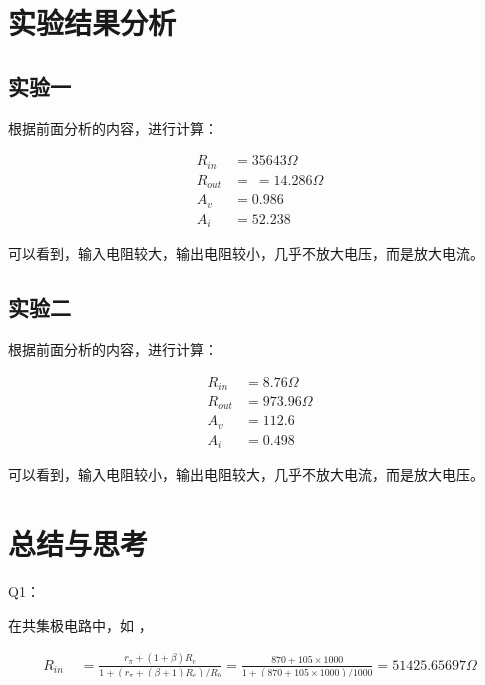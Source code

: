\documentclass[lang=cn,11pt,a4paper,cite=authoryear]{elegantpaper}
\begin{document}
\section{实验结果分析}

\subsection{实验一}

根据前面分析的内容，进行计算： 

\[\begin{aligned}
    R_{in} &=   35643 \Omega\\
    R_{out} &= \ = 14.286 \Omega  \\
    A_v &= 0.986 \\
    A_i &= 52.238 
\end{aligned}\]

可以看到，输入电阻较大，输出电阻较小，几乎不放大电压，而是放大电流。

\subsection{实验二}


根据前面分析的内容，进行计算： 

\[\begin{aligned}
    R_{in} &=   8.76 \Omega\\
    R_{out} &= 973.96 \Omega  \\
    A_v &= 112.6 \\
    A_i &= 0.498 
\end{aligned}\]

可以看到，输入电阻较小，输出电阻较大，几乎不放大电流，而是放大电压。

\section{总结与思考}

Q1： 

在共集极电路中，如  ， 

\[\begin{aligned}
    R_{in} &=  \frac{r_\pi + (1+\beta)R_e}{1 + (r_\pi + (\beta + 1) R_e) / R_b}  = \frac{870 + 105 \times 1000}{1 + (870 + 105 \times 1000) / 1000} = 51425.65697 \Omega\\
    R_{out} &= R_e // r_\pi // (r_\pi / \beta) = 7.8 \Omega\\ 
    A_v &= \frac{(1+\beta) R_e}{r_\pi + (\beta + 1) R_e} = 0.99178 \\
    A_i &= \frac{1}{2}\frac{(1+\beta) R_b}{R_b + (r_\pi + (1+\beta) R_e//R_L)} = 34.231
\end{aligned}\]
\end{document}
